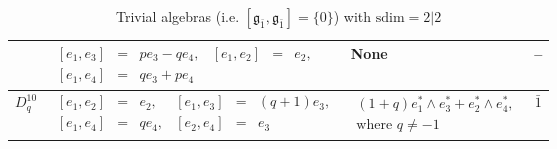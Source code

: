 \documentclass[12pt]{amsart}
\newcommand {\od} {{\bar1}}
\begin{document}
\begin{table}[H]
\begin{tabular}{| c | l | l | c| }
& 
$
\begin{array}{lcllcl}
 [e_1, e_3]&=&pe_3-qe_4, &  
 [e_1, e_2]&=&e_2, \\[2mm]
 [e_1, e_4]&=&q e_3+pe_4
\end{array}$ & None  &--\\[2mm] \hline
  $D^{10}_{q}$ & $
\begin{array}{lcllcl}
[e_1, e_2]&=&e_2, &  
 [e_1, e_3]&=&(q+1)e_3,\\[1mm]
 [e_1, e_4]&=&q e_4, &
[e_2, e_4]&=&e_3
\end{array}$ & $
\begin{array}{l}
(1+q)  e_1^*\wedge e_3^*+ e_2^*\wedge e_4^*, \\[2mm]
\text{where } q\not=-1
\end{array}
$
& $\bar 1$ \\[2mm] \hline
\end{tabular}
\caption{Trivial algebras (i.e. $[\mathfrak{g}_{\bar 1}, \mathfrak{g}_{\bar 1}]=\{0\}$) with $\mathrm{sdim}=2|2$} \label{tab1}
\end{table}
\end{document}
